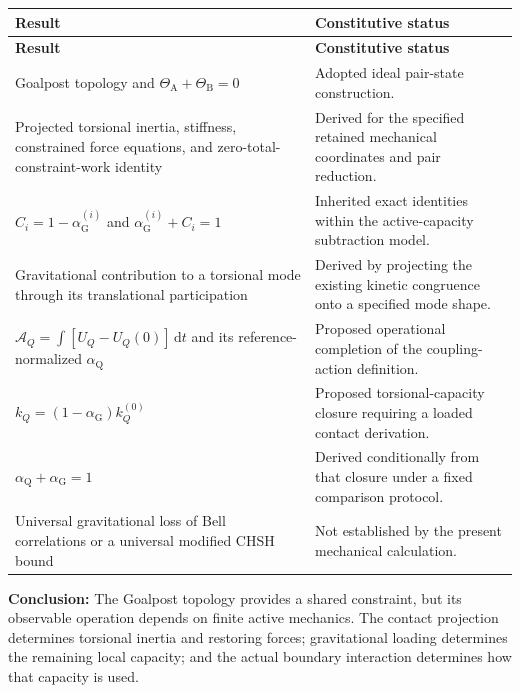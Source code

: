 \begingroup
\small
\renewcommand{\arraystretch}{1.22}
\setlength{\tabcolsep}{5pt}
\begin{longtable}{@{}>{\raggedright\arraybackslash}p{}>{\raggedright\arraybackslash}p{}@{}}
\toprule
\textbf{Result} & \textbf{Constitutive status}\\
\midrule
\endfirsthead
\toprule
\textbf{Result} & \textbf{Constitutive status}\\
\midrule
\endhead
\bottomrule
\endfoot
Goalpost topology and $\Theta_{\mathrm A}+\Theta_{\mathrm B}=0$
& Adopted ideal pair-state construction.\\
\addlinespace
Projected torsional inertia, stiffness, constrained force equations, and zero-total-constraint-work identity
& Derived for the specified retained mechanical coordinates and pair reduction.\\
\addlinespace
$C_i=1-\alpha_{\mathrm G}^{(i)}$ and $\alpha_{\mathrm G}^{(i)}+C_i=1$
& Inherited exact identities within the active-capacity subtraction model.\\
\addlinespace
Gravitational contribution to a torsional mode through its translational participation
& Derived by projecting the existing kinetic congruence onto a specified mode shape.\\
\addlinespace
$\mathcal A_Q=\int[U_Q-U_Q(0)]\,\mathrm dt$ and its reference-normalized $\alpha_{\mathrm Q}$
& Proposed operational completion of the coupling-action definition.\\
\addlinespace
$k_Q=(1-\alpha_{\mathrm G})k_Q^{(0)}$
& Proposed torsional-capacity closure requiring a loaded contact derivation.\\
\addlinespace
$\alpha_{\mathrm Q}+\alpha_{\mathrm G}=1$
& Derived conditionally from that closure under a fixed comparison protocol.\\
\addlinespace
Universal gravitational loss of Bell correlations or a universal modified CHSH bound
& Not established by the present mechanical calculation.\\
\end{longtable}
\endgroup

\noindent\textbf{Conclusion:}
The Goalpost topology provides a shared constraint, but its observable operation depends on finite active mechanics. The contact projection determines torsional inertia and restoring forces; gravitational loading determines the remaining local capacity; and the actual boundary interaction determines how that capacity is used.

